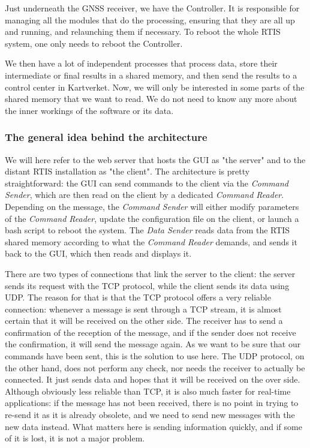 \documentclass{themeensg}
\begin{document}
Just underneath the GNSS receiver, we have the Controller. It is responsible for managing all the modules that do the processing, ensuring that they are all up and running, and relaunching them if necessary. To reboot the whole RTIS system, one only needs to reboot the Controller.

We then have a lot of independent processes that process data, store their intermediate or final results in a shared memory, and then send the results to a control center in Kartverket. Now, we will only be interested in some parts of the shared memory that we want to read. We do not need to know any more about the inner workings of the software or its data.

\subsubsection{The general idea behind the architecture}

We will here refer to the web server that hosts the GUI as "the server" and to the distant RTIS installation as "the client".
The architecture is pretty straightforward: the GUI can send commands to the client via the \textit{Command Sender}, which are then read on the client by a dedicated \textit{Command Reader}. Depending on the message, the \textit{Command Sender} will either modify parameters of the \textit{Command Reader}, update the configuration file on the client, or launch a bash script to reboot the system. The \textit{Data Sender} reads data from the RTIS shared memory according to what the \textit{Command Reader} demands, and sends it back to the GUI, which then reads and displays it.

There are two types of connections that link the server to the client: the server sends its request with the TCP protocol, while the client sends its data using UDP. The reason for that is that the TCP protocol offers a very reliable connection: whenever a message is sent through a TCP stream, it is almost certain that it will be received on the other side. The receiver has to send a confirmation of the reception of the message, and if the sender does not receive the confirmation, it will send the message again. As we want to be sure that our commands have been sent, this is the solution to use here.
The UDP protocol, on the other hand, does not perform any check, nor needs the receiver to actually be connected. It just sends data and hopes that it will be received on the over side. Although obviously less reliable than TCP, it is also much faster for real-time applications: if the message has not been received, there is no point in trying to re-send it as it is already obsolete, and we need to send new messages with the new data instead. What matters here is sending information quickly, and if some of it is lost, it is not a major problem.
\end{document}
